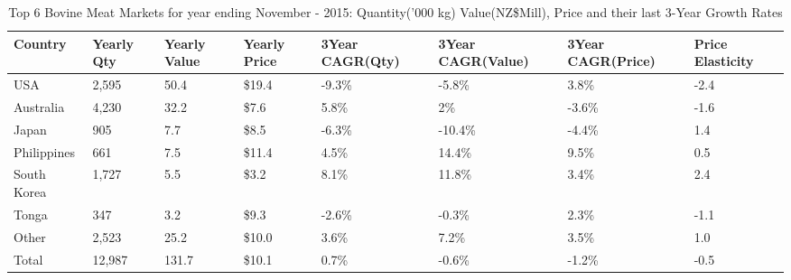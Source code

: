 \begin{table}[ht]
\centering
{\scriptsize
\begin{tabular}[t]{p{1.8cm}>{\hfill}p{1.4cm}>{\hfill}p{1.4cm}>{\hfill}p{1.6cm}>{\hfill}p{1.9cm}>{\hfill}p{2cm}>{\hfill}p{1.9cm}>{\hfill}p{1.5cm}}
 \textbf{Country} & \textbf{Yearly Qty} & \textbf{Yearly Value} & \textbf{Yearly Price} & \textbf{3Year CAGR(Qty)} & \textbf{3Year CAGR(Value)} & \textbf{3Year CAGR(Price)} & \textbf{Price Elasticity} \\
\hline
USA & 2,595 & 50.4 & \$19.4 & -9.3\% & -5.8\% & 3.8\% & -2.4 \\  
Australia & 4,230 & 32.2 & \$7.6 & 5.8\% & 2\% & -3.6\% & -1.6 \\  
Japan & 905 & 7.7 & \$8.5 & -6.3\% & -10.4\% & -4.4\% & 1.4 \\  
Philippines & 661 & 7.5 & \$11.4 & 4.5\% & 14.4\% & 9.5\% & 0.5 \\  
South Korea & 1,727 & 5.5 & \$3.2 & 8.1\% & 11.8\% & 3.4\% & 2.4 \\  
Tonga & 347 & 3.2 & \$9.3 & -2.6\% & -0.3\% & 2.3\% & -1.1 \\  
Other & 2,523 & 25.2 & \$10.0 & 3.6\% & 7.2\% & 3.5\% & 1.0 \\  
Total & 12,987 & 131.7 & \$10.1 & 0.7\% & -0.6\% & -1.2\% & -0.5 \\  
\hline
\end{tabular}
}
\caption{\scriptsize Top 6 Bovine Meat Markets for year ending November - 2015: Quantity('000 kg) Value(NZ\$Mill), Price and their last 3-Year Growth Rates}
\end{table}

